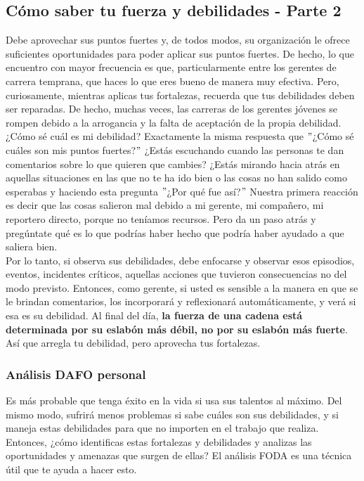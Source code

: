 \documentclass[10pt]{book}
\begin{document}
\subsection{Cómo saber tu fuerza y debilidades - Parte 2}
Debe aprovechar sus puntos fuertes y, de todos modos, su organización le ofrece suficientes oportunidades para poder aplicar sus puntos fuertes. De hecho, lo que encuentro con mayor frecuencia es que, particularmente entre los gerentes de carrera temprana, que haces lo que eres bueno de manera muy efectiva. Pero, curiosamente, mientras aplicas tus fortalezas, recuerda que tus debilidades deben ser reparadas. De hecho, muchas veces, las carreras de los gerentes jóvenes se rompen debido a la arrogancia y la falta de aceptación de la propia debilidad.\\
¿Cómo sé cuál es mi debilidad? Exactamente la misma respuesta que $"$¿Cómo sé cuáles son mis puntos fuertes?$"$ ¿Estás escuchando cuando las personas te dan comentarios sobre lo que quieren que cambies? ¿Estás mirando hacia atrás en aquellas situaciones en las que no te ha ido bien o las cosas no han salido como esperabas y haciendo esta pregunta $"$¿Por qué fue así?$"$ Nuestra primera reacción es decir que las cosas salieron mal debido a mi gerente, mi compañero, mi reportero directo, porque no teníamos recursos. Pero da un paso atrás y pregúntate qué es lo que podrías haber hecho que podría haber ayudado a que saliera bien.\\
Por lo tanto, si observa sus debilidades, debe enfocarse y observar esos episodios, eventos, incidentes críticos, aquellas acciones que tuvieron consecuencias no del modo previsto. Entonces, como gerente, si usted es sensible a la manera en que se le brindan comentarios, los incorporará y reflexionará automáticamente, y verá si esa es su debilidad. Al final del día, \textbf{la fuerza de una cadena está determinada por su eslabón más débil, no por su eslabón más fuerte}. Así que arregla tu debilidad, pero aprovecha tus fortalezas.
\subsubsection{Análisis DAFO personal}
Es más probable que tenga éxito en la vida si usa sus talentos al máximo. Del mismo modo, sufrirá menos problemas si sabe cuáles son sus debilidades, y si maneja estas debilidades para que no importen en el trabajo que realiza.\\
Entonces, ¿cómo identificas estas fortalezas y debilidades y analizas las oportunidades y amenazas que surgen de ellas? El análisis FODA es una técnica útil que te ayuda a hacer esto.\\
\end{document}
